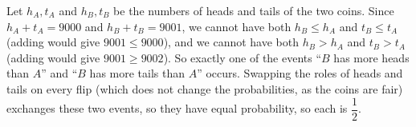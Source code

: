 Let $h_A,t_A$ and $h_B,t_B$ be the numbers of heads and tails of the two coins. Since $h_A+t_A=9000$ and $h_B+t_B=9001$, we cannot have both $h_B\le h_A$ and $t_B\le t_A$ (adding would give $9001\le9000$), and we cannot have both $h_B>h_A$ and $t_B>t_A$ (adding would give $9001\ge9002$). So exactly one of the events ``$B$ has more heads than $A$'' and ``$B$ has more tails than $A$'' occurs. Swapping the roles of heads and tails on every flip (which does not change the probabilities, as the coins are fair) exchanges these two events, so they have equal probability, so each is $\boxed{\dfrac{1}{2}}$.
